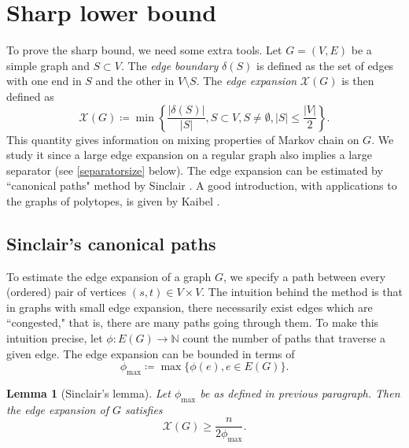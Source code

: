 \documentclass[a4paper,12pt]{book}
\theoremstyle{plain}
\newtheorem{lemma}[theorem]{Lemma}
\theoremstyle{definition}
\begin{document}
\section{Sharp lower bound}

To prove the sharp bound, we need some extra tools. Let $G= (V,E)$ be a simple graph and
 $S\subset V$. The \textit{edge boundary} $\delta(S)$ is defined as the set of edges with one end
in $S$ and the other in $V\setminus S$. The \textit{edge expansion} $\mathcal{X}(G)$ is then defined
as 
\begin{equation}
\mathcal{X}(G) \coloneqq  \min \left\{ \frac{ |\delta(S) |}{ |S |}, S \subset V, S\neq \emptyset, |S| \leq \frac{ |V |}{2}  \right\}.
\end{equation} 
This quantity gives information on mixing properties of Markov chain on $G$. We study it since
a large edge expansion on a regular graph also implies a large separator (see \ref{separatorsize} below).
The edge expansion can be estimated by ``canonical paths" method by Sinclair \cite{Sinclair}. 
A good introduction, with applications to the graphs of polytopes, is given by Kaibel \cite{Kaibel}. 

\subsection{Sinclair's canonical paths}

To estimate the edge expansion of a graph $G$, we specify a path between every (ordered) pair of vertices $(s,t) \in V \times V$.
The intuition behind the method is that in graphs with small edge expansion, there necessarily exist edges which are ``congested," that is, there
are many paths going through them. To make this intuition precise, let $\phi: E(G) \rightarrow \mathbb{N}$ count the number of paths
that traverse a given edge. The edge expansion can be bounded 
in terms of
\begin{equation}
\phi_{\max} \coloneqq \max \{ \phi(e), e \in E(G) \}.
\end{equation}


\begin{lemma}[Sinclair's lemma]
\label{Sinclair}
Let $\phi_{\max}$ be as defined in previous paragraph. Then the edge expansion of $G$ satisfies 
\begin{equation}
\mathcal{X}(G) \ge \frac{n}{2 \phi_{\max}}.
\end{equation}
\end{lemma}
\end{document}
